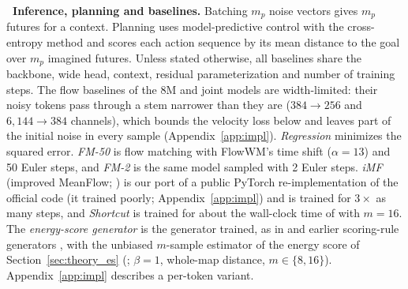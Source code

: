 \leavevmode{}\textbf{\thesubsection\ Inference, planning and baselines.}
\label{sec:baselines}
Batching $m_p$ noise vectors gives $m_p$ futures for a context. Planning uses model-predictive control with the cross-entropy method \citep[CEM-MPC;][]{rubinstein1999cem,zhou2025dinowm} and scores each action sequence by its mean distance to the goal over $m_p$ imagined futures. Unless stated otherwise, all baselines share the backbone, wide head, context, residual parameterization and number of training steps. The flow baselines of the 8M and joint models are width-limited: their noisy tokens pass through a stem narrower than they are ($384 \to 256$ and $6{,}144 \to 384$ channels), which bounds the velocity loss below \citep[Theorem~1]{zheng2025rae} and leaves part of the initial noise in every sample (Appendix~\ref{app:impl}). \emph{Regression} minimizes the squared error. \emph{FM-50} is flow matching \citep{lipman2023flow} with FlowWM's time shift ($\alpha = 13$) and 50 Euler steps, and \emph{FM-2} is the same model sampled with 2 Euler steps. \emph{iMF} (improved MeanFlow; \citealp{geng2025meanflow,geng2025imf}) is our port of a public PyTorch re-implementation of the official code (it trained poorly; Appendix~\ref{app:impl}) and is trained for $3\times$ as many steps, and \emph{Shortcut} \citep{frans2025shortcut,hafner2025dreamer4} is trained for about the wall-clock time of \imlewm{} with $m{=}16$. The \emph{energy-score generator} is the \imlewm{} generator trained, as in \citet{makabe2026esp} and earlier scoring-rule generators \citep{pacchiardi2024likelihoodfree,shen2024engression}, with the unbiased $m$-sample estimator of the energy score of Section~\ref{sec:theory_es} (\citealp{gneiting2007strictly}; $\beta = 1$, whole-map distance, $m \in \{8, 16\}$). Appendix~\ref{app:impl} describes a per-token variant.
